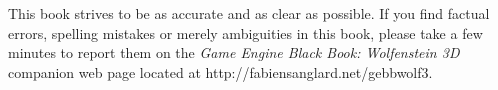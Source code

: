 This book strives to be as accurate and as clear as possible. If you find factual errors, spelling mistakes or merely ambiguities in this book, please take a few minutes to report them on the \textit{Game Engine Black Book: Wolfenstein 3D} companion web page located at http://fabiensanglard.net/gebbwolf3.